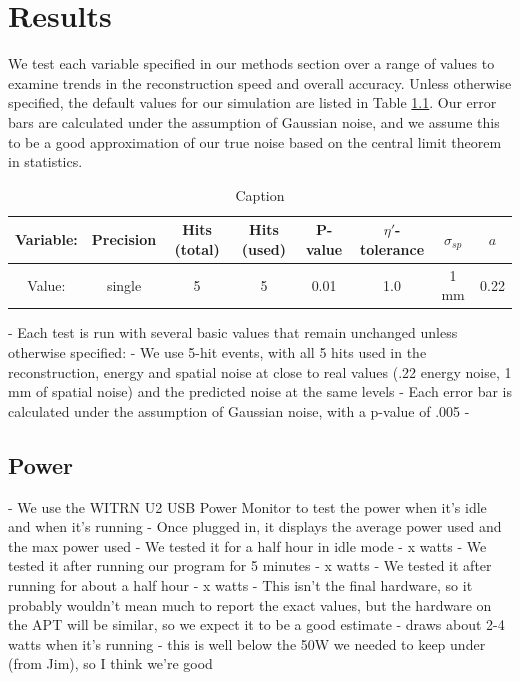 \chapter{Results}
We test each variable specified in our methods section over a range of values to examine trends in the reconstruction speed and overall accuracy. Unless otherwise specified, the default values for our simulation are listed in Table \ref{tab:def_vals}. Our error bars are calculated under the assumption of Gaussian noise, and we assume this to be a good approximation of our true noise based on the central limit theorem in statistics.\\

\begin{table}[h]
    \centering
    \begin{tabular}{|c|c|c|c|c|c|c|c|}
    \hline
    Variable: & Precision & Hits (total) & Hits (used) & P-value & $\eta'$-tolerance & $\sigma_{sp}$ & $a$ \\
    \hline
    Value: & single & 5 & 5 & 0.01 & 1.0 & 1 mm & 0.22 \\
    \hline
    \end{tabular}
    \caption{Caption}
    \label{tab:def_vals}
\end{table}

- Each test is run with several basic values that remain unchanged unless otherwise specified: 
- We use 5-hit events, with all 5 hits used in the reconstruction, energy and spatial noise at close to real values (.22 energy noise, 1 mm of spatial noise) and the predicted noise at the same levels
- Each error bar is calculated under the assumption of Gaussian noise, with a p-value of .005
- 

\section{Power}

- We use the WITRN U2 USB Power Monitor to test the power when it's idle and when it's running
- Once plugged in, it displays the average power used and the max power used
- We tested it for a half hour in idle mode - x watts
- We tested it after running our program for 5 minutes - x watts
- We tested it after running for about a half hour - x watts
- This isn't the final hardware, so it probably wouldn't mean much to report the exact values, but the hardware on the APT will be similar, so we expect it to be a good estimate
- draws about 2-4 watts when it's running
- this is well below the 50W we needed to keep under (from Jim), so I think we're good

